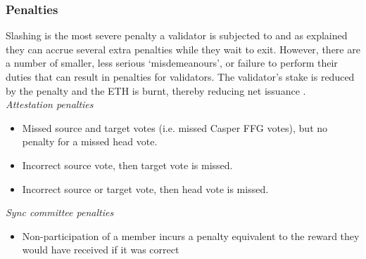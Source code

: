 \documentclass{article}
\begin{document}
\subsubsection*{Penalties} Slashing is the most severe penalty a validator is
subjected to and as explained they can accrue several extra penalties while
they wait to exit. However, there are a number of smaller, less serious
`misdemeanours', or failure to perform their duties that can result in
penalties for validators. The validator's stake is reduced by the penalty and
the ETH is burnt, thereby reducing net issuance \cite{Edgington2023}. \\

\textit{Attestation penalties}
\begin{itemize}
  \item Missed source and target votes (i.e. missed Casper FFG votes), but no
    penalty for a missed head vote.
  \item Incorrect source vote, then target vote is missed.
  \item Incorrect source or target vote, then head vote is missed.
\end{itemize}

\textit{Sync committee penalties}
\begin{itemize}
  \item Non-participation of a member incurs a penalty equivalent to the reward
    they would have received if it was correct
\end{itemize}
\end{document}
